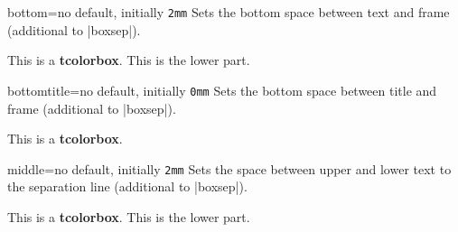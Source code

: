 \clearpage
\begin{docTcbKey}{bottom}{=}{no default, initially \texttt{2mm}}
  Sets the bottom space between text and frame (additional to |boxsep|).
\begin{dispExample}

\begin{tcolorbox}[bottom=0mm]
This is a \textbf{tcolorbox}.
\tcblower
This is the lower part.
\end{tcolorbox}
\end{dispExample}
\end{docTcbKey}

\begin{docTcbKey}{bottomtitle}{=}{no default, initially \texttt{0mm}}
  Sets the bottom space between title and frame (additional to |boxsep|).
\begin{dispExample}

\begin{tcolorbox}[bottomtitle=3mm,title=My title]
This is a \textbf{tcolorbox}.
\end{tcolorbox}
\end{dispExample}
\end{docTcbKey}


\begin{docTcbKey}{middle}{=}{no default, initially \texttt{2mm}}
  Sets the space between upper and lower text to the separation line
  (additional to |boxsep|).
\begin{dispExample}

\begin{tcolorbox}[middle=0mm,boxsep=0mm]
This is a \textbf{tcolorbox}.
\tcblower
This is the lower part.
\end{tcolorbox}
\end{dispExample}
\end{docTcbKey}

\clearpage
